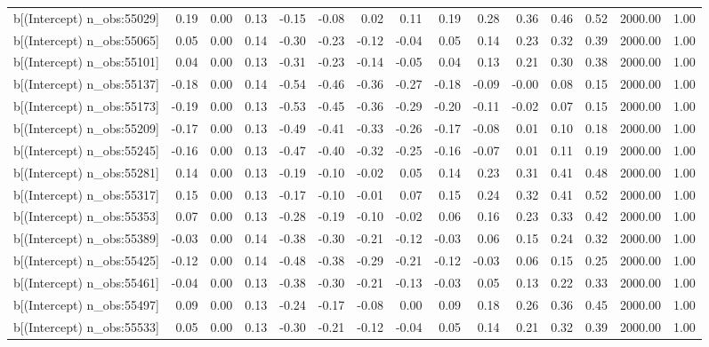 \begin{table}[ht]
\begin{tabular}{rrrrrrrrrrrrrrr}
  b[(Intercept) n\_obs:55029] & 0.19 & 0.00 & 0.13 & -0.15 & -0.08 & 0.02 & 0.11 & 0.19 & 0.28 & 0.36 & 0.46 & 0.52 & 2000.00 & 1.00 \\ 
  b[(Intercept) n\_obs:55065] & 0.05 & 0.00 & 0.14 & -0.30 & -0.23 & -0.12 & -0.04 & 0.05 & 0.14 & 0.23 & 0.32 & 0.39 & 2000.00 & 1.00 \\ 
  b[(Intercept) n\_obs:55101] & 0.04 & 0.00 & 0.13 & -0.31 & -0.23 & -0.14 & -0.05 & 0.04 & 0.13 & 0.21 & 0.30 & 0.38 & 2000.00 & 1.00 \\ 
  b[(Intercept) n\_obs:55137] & -0.18 & 0.00 & 0.14 & -0.54 & -0.46 & -0.36 & -0.27 & -0.18 & -0.09 & -0.00 & 0.08 & 0.15 & 2000.00 & 1.00 \\ 
  b[(Intercept) n\_obs:55173] & -0.19 & 0.00 & 0.13 & -0.53 & -0.45 & -0.36 & -0.29 & -0.20 & -0.11 & -0.02 & 0.07 & 0.15 & 2000.00 & 1.00 \\ 
  b[(Intercept) n\_obs:55209] & -0.17 & 0.00 & 0.13 & -0.49 & -0.41 & -0.33 & -0.26 & -0.17 & -0.08 & 0.01 & 0.10 & 0.18 & 2000.00 & 1.00 \\ 
  b[(Intercept) n\_obs:55245] & -0.16 & 0.00 & 0.13 & -0.47 & -0.40 & -0.32 & -0.25 & -0.16 & -0.07 & 0.01 & 0.11 & 0.19 & 2000.00 & 1.00 \\ 
  b[(Intercept) n\_obs:55281] & 0.14 & 0.00 & 0.13 & -0.19 & -0.10 & -0.02 & 0.05 & 0.14 & 0.23 & 0.31 & 0.41 & 0.48 & 2000.00 & 1.00 \\ 
  b[(Intercept) n\_obs:55317] & 0.15 & 0.00 & 0.13 & -0.17 & -0.10 & -0.01 & 0.07 & 0.15 & 0.24 & 0.32 & 0.41 & 0.52 & 2000.00 & 1.00 \\ 
  b[(Intercept) n\_obs:55353] & 0.07 & 0.00 & 0.13 & -0.28 & -0.19 & -0.10 & -0.02 & 0.06 & 0.16 & 0.23 & 0.33 & 0.42 & 2000.00 & 1.00 \\ 
  b[(Intercept) n\_obs:55389] & -0.03 & 0.00 & 0.14 & -0.38 & -0.30 & -0.21 & -0.12 & -0.03 & 0.06 & 0.15 & 0.24 & 0.32 & 2000.00 & 1.00 \\ 
  b[(Intercept) n\_obs:55425] & -0.12 & 0.00 & 0.14 & -0.48 & -0.38 & -0.29 & -0.21 & -0.12 & -0.03 & 0.06 & 0.15 & 0.25 & 2000.00 & 1.00 \\ 
  b[(Intercept) n\_obs:55461] & -0.04 & 0.00 & 0.13 & -0.38 & -0.30 & -0.21 & -0.13 & -0.03 & 0.05 & 0.13 & 0.22 & 0.33 & 2000.00 & 1.00 \\ 
  b[(Intercept) n\_obs:55497] & 0.09 & 0.00 & 0.13 & -0.24 & -0.17 & -0.08 & 0.00 & 0.09 & 0.18 & 0.26 & 0.36 & 0.45 & 2000.00 & 1.00 \\ 
  b[(Intercept) n\_obs:55533] & 0.05 & 0.00 & 0.13 & -0.30 & -0.21 & -0.12 & -0.04 & 0.05 & 0.14 & 0.21 & 0.32 & 0.39 & 2000.00 & 1.00 \\ 

\end{tabular}
\end{table}
